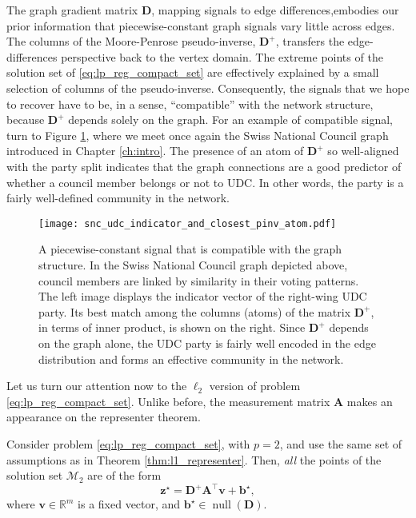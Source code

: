 The graph gradient matrix $\mathbf{D}$, mapping signals to edge differences,embodies our prior information that piecewise-constant graph signals vary little across edges. The columns of the  Moore-Penrose pseudo-inverse, $\mathbf{D}^+$, transfers the edge-differences perspective back to the vertex domain. The extreme points of the solution set of \eqref{eq:lp_reg_compact_set} are effectively explained by a small selection of columns of the pseudo-inverse. Consequently, the signals that we hope to recover have to be, in a sense, ``compatible'' with the network structure, because $\mathbf{D}^+$ depends solely on the graph. For an example of compatible signal, turn to Figure \ref{fig:snc_udc_indicator_and_closest_pinv_atom}, where we meet once again the Swiss National Council graph introduced in Chapter \ref{ch:intro}. The presence of an atom of $\mathbf{D}^+$ so well-aligned with the party split indicates that the graph connections are a good predictor of whether a council member belongs or not to UDC. In other words, the party is a fairly well-defined community in the network.

\clearpage

\begin{figure}[H]
    \centering
    \texttt{[image: snc\_udc\_indicator\_and\_closest\_pinv\_atom.pdf]}
    \caption[A piecewise-constant signal that is compatible with the graph structure]{A piecewise-constant signal that is compatible with the graph structure. In the Swiss National Council graph depicted above, council members are linked by similarity in their voting patterns. The left image displays the indicator vector of the right-wing UDC party. Its best match among the columns (atoms) of the matrix $\mathbf{D}^+$, in terms of inner product, is shown on the right. Since $\mathbf{D}^+$ depends on the graph alone, the UDC party is fairly well encoded in the edge distribution and forms an effective community in the network.}
    \label{fig:snc_udc_indicator_and_closest_pinv_atom}
\end{figure}

Let us turn our attention now to the $\ell_2$ version of problem \eqref{eq:lp_reg_compact_set}. Unlike before, the measurement matrix $\mathbf{A}$ makes an appearance on the representer theorem.

\begin{theorem}\label{thm:l2_representer}
    Consider problem \eqref{eq:lp_reg_compact_set}, with $p=2$, and use the same set of assumptions as in Theorem \ref{thm:l1_representer}. Then, \emph{all} the points of the solution set $\mathcal{M}_2$ are of the form
    \begin{equation}
        \mathbf{z}^\star = \mathbf{D}^+ \mathbf{A}^\top \mathbf{v} + \mathbf{b}^\star,
    \end{equation}
    where $\mathbf{v} \in \mathbb{R}^{m}$ is a fixed vector, and $\mathbf{b}^\star \in \operatorname{null} \left ( \mathbf{D} \right )$.
\end{theorem}

